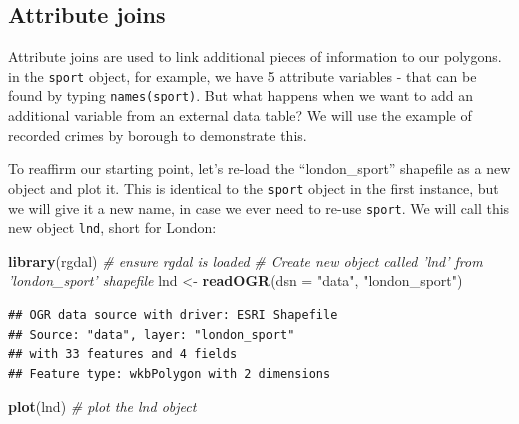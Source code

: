\documentclass[]{article}
\newenvironment{Shaded}{}{}
\newcommand{\KeywordTok}[1]{\textcolor[rgb]{0.00,0.44,0.13}{\textbf{{#1}}}}
\newcommand{\DataTypeTok}[1]{\textcolor[rgb]{0.56,0.13,0.00}{{#1}}}
\newcommand{\StringTok}[1]{\textcolor[rgb]{0.25,0.44,0.63}{{#1}}}
\newcommand{\CommentTok}[1]{\textcolor[rgb]{0.38,0.63,0.69}{\textit{{#1}}}}
\newcommand{\NormalTok}[1]{{#1}}
\begin{document}
\subsection{Attribute joins}\label{attribute-joins}

Attribute joins are used to link additional pieces of information to our
polygons. in the \texttt{sport} object, for example, we have 5 attribute
variables - that can be found by typing \texttt{names(sport)}. But what
happens when we want to add an additional variable from an external data
table? We will use the example of recorded crimes by borough to
demonstrate this.

To reaffirm our starting point, let's re-load the ``london\_sport''
shapefile as a new object and plot it. This is identical to the
\texttt{sport} object in the first instance, but we will give it a new
name, in case we ever need to re-use \texttt{sport}. We will call this
new object \texttt{lnd}, short for London:

\begin{Shaded}
\begin{Highlighting}[]
\KeywordTok{library}\NormalTok{(rgdal)  }\CommentTok{# ensure rgdal is loaded}
\CommentTok{# Create new object called 'lnd' from 'london_sport' shapefile}
\NormalTok{lnd <-}\StringTok{ }\KeywordTok{readOGR}\NormalTok{(}\DataTypeTok{dsn =} \StringTok{"data"}\NormalTok{, }\StringTok{"london_sport"}\NormalTok{)}
\end{Highlighting}
\end{Shaded}

\begin{verbatim}
## OGR data source with driver: ESRI Shapefile 
## Source: "data", layer: "london_sport"
## with 33 features and 4 fields
## Feature type: wkbPolygon with 2 dimensions
\end{verbatim}

\begin{Shaded}
\begin{Highlighting}[]

\KeywordTok{plot}\NormalTok{(lnd)  }\CommentTok{# plot the lnd object }
\end{Highlighting}
\end{Shaded}
\end{document}
